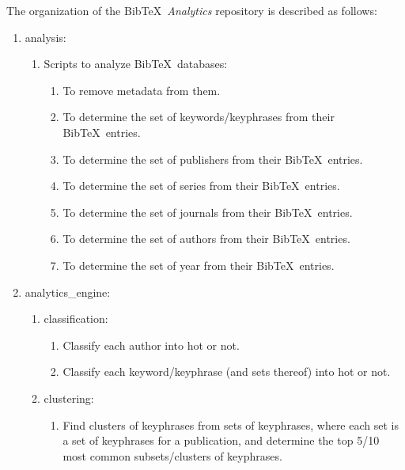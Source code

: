 The organization of the {\sc Bib}\TeX\ {\it Analytics} repository is described as follows: \vspace{-0.3cm}
\begin{enumerate} \itemsep -4pt
\item analysis: \vspace{-0.3cm}
	\begin{enumerate} \itemsep -2pt
	\item Scripts to analyze {\sc Bib}\TeX\ databases: \vspace{-0.2cm}
		\begin{enumerate} \itemsep -2pt
		\item To remove metadata from them.
		\item To determine the set of keywords/keyphrases from their {\sc Bib}\TeX\ entries.
		\item To determine the set of publishers from their {\sc Bib}\TeX\ entries.
		\item To determine the set of series from their {\sc Bib}\TeX\ entries.
		\item To determine the set of journals from their {\sc Bib}\TeX\ entries.
		\item To determine the set of authors from their {\sc Bib}\TeX\ entries.
		\item To determine the set of year from their {\sc Bib}\TeX\ entries.
		\end{enumerate}
	\end{enumerate}
\item analytics\_engine: \vspace{-0.3cm}
	\begin{enumerate} \itemsep -2pt
	\item classification: \vspace{-0.2cm}
		\begin{enumerate} \itemsep -2pt
		\item Classify each author into hot or not.
		\item Classify each keyword/keyphrase (and sets thereof) into hot or not.
		\end{enumerate}
	\item clustering: \vspace{-0.2cm}
		\begin{enumerate} \itemsep -2pt
		\item Find clusters of keyphrases from sets of keyphrases, where each set is a set of keyphrases for a publication, and determine the top 5/10 most common subsets/clusters of keyphrases.
		\end{enumerate}

\end{enumerate}
\end{enumerate}
